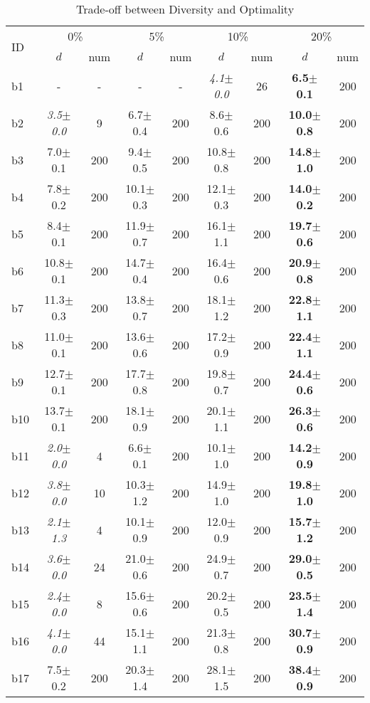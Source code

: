 \begin{longtable}{|l|c|c|c|c|c|c|c|c|}
\caption{\label{tab:agaps} Trade-off between Diversity and Optimality}\\
\hline
\multirow{2}{*}{ID}&\multicolumn{2}{c|}{0\%}&\multicolumn{2}{c|}{5\%}&\multicolumn{2}{c|}{10\%}&\multicolumn{2}{c|}{20\%}\\
\cline{2-9}
&$d$&num&$d$&num&$d$&num&$d$&num\\
\hline
b1&- & -&- & -&\textit{4.1$\pm$0.0} & 26&\textbf{6.5$\pm$0.1} & 200
\\
b2&\textit{3.5$\pm$0.0} & 9&6.7$\pm$0.4 & 200&8.6$\pm$0.6 & 200&\textbf{10.0$\pm$0.8} & 200
\\
b3&7.0$\pm$0.1 & 200&9.4$\pm$0.5 & 200&10.8$\pm$0.8 & 200&\textbf{14.8$\pm$1.0} & 200
\\
b4&7.8$\pm$0.2 & 200&10.1$\pm$0.3 & 200&12.1$\pm$0.3 & 200&\textbf{14.0$\pm$0.2} & 200
\\
b5&8.4$\pm$0.1 & 200&11.9$\pm$0.7 & 200&16.1$\pm$1.1 & 200&\textbf{19.7$\pm$0.6} & 200
\\
b6&10.8$\pm$0.1 & 200&14.7$\pm$0.4 & 200&16.4$\pm$0.6 & 200&\textbf{20.9$\pm$0.8} & 200
\\
b7&11.3$\pm$0.3 & 200&13.8$\pm$0.7 & 200&18.1$\pm$1.2 & 200&\textbf{22.8$\pm$1.1} & 200
\\
b8&11.0$\pm$0.1 & 200&13.6$\pm$0.6 & 200&17.2$\pm$0.9 & 200&\textbf{22.4$\pm$1.1} & 200
\\
b9&12.7$\pm$0.1 & 200&17.7$\pm$0.8 & 200&19.8$\pm$0.7 & 200&\textbf{24.4$\pm$0.6} & 200
\\
b10&13.7$\pm$0.1 & 200&18.1$\pm$0.9 & 200&20.1$\pm$1.1 & 200&\textbf{26.3$\pm$0.6} & 200
\\
b11&\textit{2.0$\pm$0.0} & 4&6.6$\pm$0.1 & 200&10.1$\pm$1.0 & 200&\textbf{14.2$\pm$0.9} & 200
\\
b12&\textit{3.8$\pm$0.0} & 10&10.3$\pm$1.2 & 200&14.9$\pm$1.0 & 200&\textbf{19.8$\pm$1.0} & 200
\\
b13&\textit{2.1$\pm$1.3} & 4&10.1$\pm$0.9 & 200&12.0$\pm$0.9 & 200&\textbf{15.7$\pm$1.2} & 200
\\
b14&\textit{3.6$\pm$0.0} & 24&21.0$\pm$0.6 & 200&24.9$\pm$0.7 & 200&\textbf{29.0$\pm$0.5} & 200
\\
b15&\textit{2.4$\pm$0.0} & 8&15.6$\pm$0.6 & 200&20.2$\pm$0.5 & 200&\textbf{23.5$\pm$1.4} & 200
\\
b16&\textit{4.1$\pm$0.0} & 44&15.1$\pm$1.1 & 200&21.3$\pm$0.8 & 200&\textbf{30.7$\pm$0.9} & 200
\\
b17&7.5$\pm$0.2 & 200&20.3$\pm$1.4 & 200&28.1$\pm$1.5 & 200&\textbf{38.4$\pm$0.9} & 200
\\
\hline
\end{longtable}
